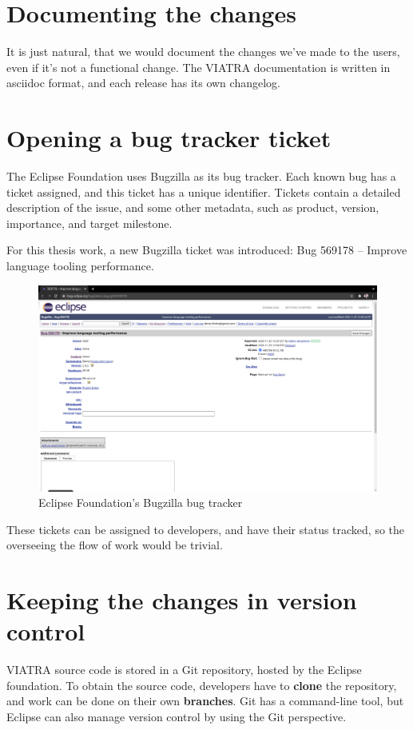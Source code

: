 \documentclass[11pt,a4paper,oneside]{report}
\begin{document}
\section{Documenting the changes}
It is just natural, that we would document the changes we've made to the users,
even if it's not a functional change. The VIATRA documentation is written in
asciidoc format, and each release has its own changelog.

\section{Opening a bug tracker ticket}
The Eclipse Foundation uses Bugzilla as its bug tracker. Each known bug has a
ticket assigned, and this ticket has a unique identifier. Tickets contain
a detailed description of the issue, and some other metadata, such as product,
version, importance, and target milestone.

For this thesis work, a new Bugzilla ticket was introduced:
Bug 569178 -- Improve language tooling performance.

\begin{figure}[ht]
\centering
\includegraphics[width=150mm, keepaspectratio]{figures/bugzilla.png}
\caption{Eclipse Foundation's Bugzilla bug tracker}
\label{fig:bugzilla}
\end{figure}

These tickets can be assigned to developers, and have their status tracked, so
the overseeing the flow of work would be trivial.

\section{Keeping the changes in version control}
VIATRA source code is stored in a Git repository, hosted by the Eclipse
foundation. To obtain the source code, developers have to \textbf{clone} the
repository, and work can be done on their own \textbf{branches}. Git has a
command-line tool, but Eclipse can also manage version control by using the
Git perspective.
\end{document}
